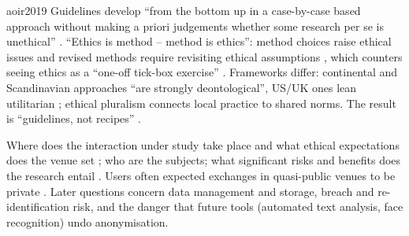 \begin{papercard}{aoir2019}
 Guidelines develop ``from the bottom up in a case-by-case based approach without making a priori judgements whether some research per se is unethical'' . ``Ethics is method -- method is ethics'': method choices raise ethical issues and revised methods require revisiting ethical assumptions , which counters seeing ethics as a ``one-off tick-box exercise'' . Frameworks differ: continental and Scandinavian approaches ``are strongly deontological'', US/UK ones lean utilitarian ; ethical pluralism connects local practice to shared norms. The result is ``guidelines, not recipes'' .

 Where does the interaction under study take place and what ethical expectations does the venue set ; who are the subjects; what significant risks and benefits does the research entail . Users often expected exchanges in quasi-public venues to be private . Later questions concern data management and storage, breach and re-identification risk, and the danger that future tools (automated text analysis, face recognition) undo anonymisation.


\end{papercard}
